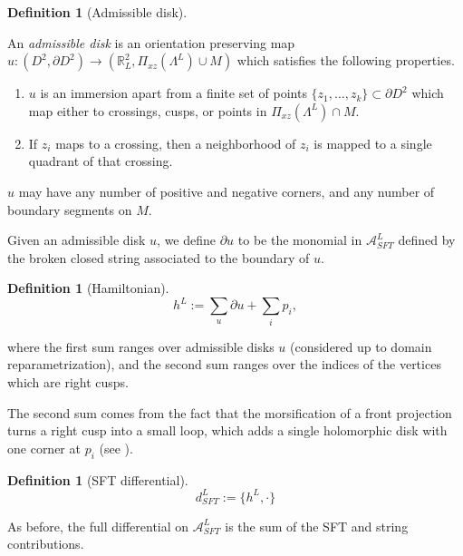 \documentclass[a4paper,final, reqno]{amsart}
\theoremstyle{plain}
\theoremstyle{definition}
\newtheorem{Def}[Th]{Definition}
\newcommand{\A}{\mathcal{A}}
\begin{document}
	\begin{Def}[Admissible disk] \-\
		
		An \emph{admissible disk} is an orientation preserving map $u:(D^2, \partial D^2) \to (\mathbb{R}^2_L, \Pi_{xz}(\Lambda^L) \cup M)$ which satisfies the following properties.
		
		\begin{enumerate}
			\item $u$ is an immersion apart from a finite set of points $\{z_1,\dots, z_k\} \subset \partial D^2$ which map either to crossings, cusps, or points in $\Pi_{xz}(\Lambda^L) \cap M$. 
			\item If $z_i$ maps to a crossing, then a neighborhood of $z_i$ is mapped to a single quadrant of that crossing.
		\end{enumerate}
		
		$u$ may have any number of positive and negative corners, and any number of boundary segments on $M$. 
		
		Given an admissible disk $u$, we define $\partial u$ to be the monomial in $\A^L_{SFT}$ defined by the broken closed string associated to the boundary of $u$. 
		
	\end{Def}
	
	
	
	
	
	\begin{Def}[Hamiltonian]
		
		\[ h^L := \sum_{u} \partial u + \sum_{i} p_i, \]
		
		where the first sum ranges over admissible disks $u$ (considered up to domain reparametrization), and the second sum ranges over the indices of the vertices which are right cusps.
		
		
		
		
	\end{Def}
	
	
	The second sum comes from the fact that the morsification of a front projection turns a right cusp into a small loop, which adds a single holomorphic disk with one corner at $p_i$ (see ).
	
	
	
	
	\begin{Def}[SFT differential]
		\[ d_{SFT}^L := \{h^L, \cdot\}\]
	\end{Def}
	
	As before, the full differential on $\A^L_{SFT}$ is the sum of the SFT and string contributions.
	
\end{document}
